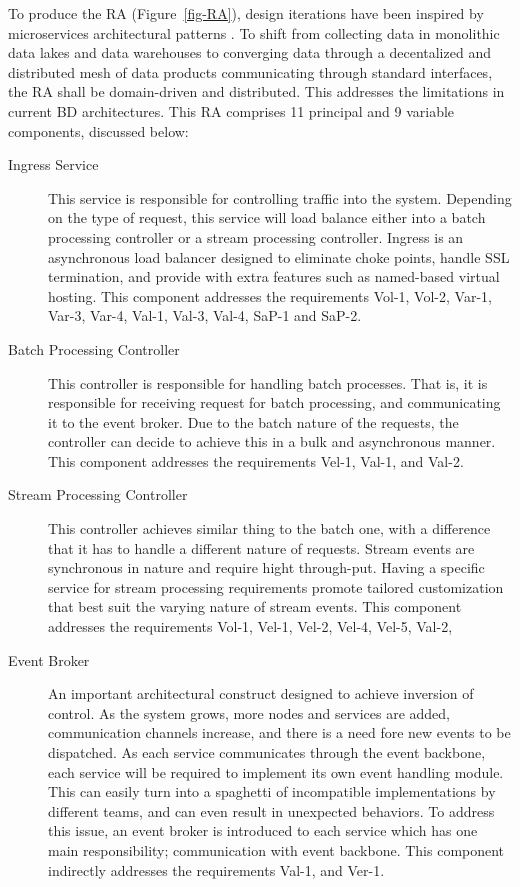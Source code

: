 \documentclass[a4paper,11pt]{article}
\let\cite\citep
\begin{document}
To produce the RA (Figure~\ref{fig-RA}), design iterations have been inspired by microservices architectural patterns \cite{richardson2018microservices}. To shift from collecting data in monolithic data lakes and data warehouses to converging data through a decentalized and distributed mesh of data products communicating through standard interfaces, the RA shall be domain-driven and distributed. This addresses the limitations in current BD architectures. This RA comprises 11 principal and 9 variable components, discussed below:

\begin{description}
    \item[Ingress Service] This service is responsible for controlling traffic into the system. Depending on the type of request, this service will load balance either into a batch processing controller or a stream processing controller. Ingress is an asynchronous load balancer designed to eliminate choke points, handle SSL termination, and provide with extra features such as named-based virtual hosting. This component addresses the requirements Vol-1, Vol-2, Var-1, Var-3, Var-4, Val-1, Val-3, Val-4, SaP-1 and SaP-2. 
    
    \item[Batch Processing Controller] This controller is responsible for handling batch processes. That is, it is responsible for receiving request for batch processing, and communicating it to the event broker. Due to the batch nature of the requests, the controller can decide to achieve this in a bulk and asynchronous manner. This component addresses the requirements Vel-1, Val-1, and Val-2. 
    
    \item[Stream Processing Controller] This controller achieves similar thing to the batch one, with a difference that it has to handle a different nature of requests. Stream events are synchronous in nature and require hight through-put. Having a specific service for stream processing requirements promote tailored customization that best suit the varying nature of stream events. This component addresses the requirements Vol-1, Vel-1, Vel-2, Vel-4, Vel-5, Val-2,  
    
    \item[Event Broker] An important architectural construct designed to achieve inversion of control. As the system grows, more nodes and services are added, communication channels increase, and there is a need fore new events to be dispatched. As each service communicates through the event backbone, each service will be required to implement its own event handling module. This can easily turn into a spaghetti of incompatible implementations by different teams, and can even result in unexpected behaviors. To address this issue, an event broker is introduced to each service which has one main responsibility; communication with event backbone. This component indirectly addresses the requirements Val-1, and Ver-1.  
    

\end{description}
\end{document}
